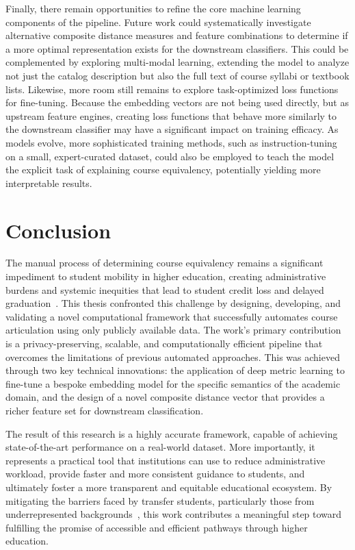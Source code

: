 Finally, there remain opportunities to refine the core machine learning components of the pipeline. Future work could systematically investigate alternative composite distance measures and feature combinations to determine if a more optimal representation exists for the downstream classifiers. This could be complemented by exploring multi-modal learning, extending the model to analyze not just the catalog description but also the full text of course syllabi or textbook lists. Likewise, more room still remains to explore task-optimized loss functions for fine-tuning.  Because the embedding vectors are not being used directly, but as upstream feature engines, creating loss functions that behave more similarly to the downstream classifier may have a significant impact on training efficacy.  As models evolve, more sophisticated training methods, such as instruction-tuning on a small, expert-curated dataset, could also be employed to teach the model the explicit task of explaining course equivalency, potentially yielding more interpretable results.

\section{Conclusion}\label{ch:5.4}
The manual process of determining course equivalency remains a significant impediment to student mobility in higher education, creating administrative burdens and systemic inequities that lead to student credit loss and delayed graduation~\cite{gao2017, collegeopportunity2017}. This thesis confronted this challenge by designing, developing, and validating a novel computational framework that successfully automates course articulation using only publicly available data. The work's primary contribution is a privacy-preserving, scalable, and computationally efficient pipeline that overcomes the limitations of previous automated approaches. This was achieved through two key technical innovations: the application of deep metric learning to fine-tune a bespoke embedding model for the specific semantics of the academic domain, and the design of a novel composite distance vector that provides a richer feature set for downstream classification.

The result of this research is a highly accurate framework, capable of achieving state-of-the-art performance on a real-world dataset. More importantly, it represents a practical tool that institutions can use to reduce administrative workload, provide faster and more consistent guidance to students, and ultimately foster a more transparent and equitable educational ecosystem. By mitigating the barriers faced by transfer students, particularly those from underrepresented backgrounds~\cite{ace2025}, this work contributes a meaningful step toward fulfilling the promise of accessible and efficient pathways through higher education.